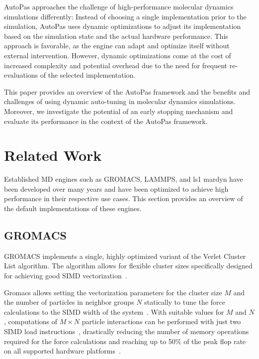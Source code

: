 \documentclass[conference]{IEEEtran}
\begin{document}
AutoPas approaches the challenge of high-performance molecular dynamics simulations differently: Instead of choosing a single implementation prior to the simulation, AutoPas uses dynamic optimizations to adjust its implementation based on the simulation state and the actual hardware performance. This approach is favorable, as the engine can adapt and optimize itself without external intervention. However, dynamic optimizations come at the cost of increased complexity and potential overhead due to the need for frequent re-evaluations of the selected implementation.

This paper provides an overview of the AutoPas framework and the benefits and challenges of using dynamic auto-tuning in molecular dynamics simulations. Moreover, we investigate the potential of an early stopping mechanism and evaluate its performance in the context of the AutoPas framework.

\section{Related Work}

Established MD engines such as GROMACS, LAMMPS, and ls1 mardyn have been developed over many years and have been optimized to achieve high performance in their respective use cases. This section provides an overview of the default implementations of these engines.

\subsection{GROMACS}

GROMACS implements a single, highly optimized variant of the Verlet Cluster List algorithm. The algorithm allows for flexible cluster sizes specifically designed for achieving good SIMD vectorization~\cite{PALL20132641}.

Gromacs allows setting the vectorization parameters for the cluster size $M$ and the number of particles in neighbor groups $N$ statically to tune the force calculations to the SIMD width of the system~\cite{PALL20132641}. With suitable values for $M$ and $N$, computations of $M \times N$ particle interactions can be performed with just two SIMD load instructions~\cite{Solving_Software_Challenges_Exascale_2014}, drastically reducing the number of memory operations required for the force calculations and reaching up to 50\% of the peak flop rate on all supported hardware platforms~\cite{Solving_Software_Challenges_Exascale_2014}.
\end{document}
